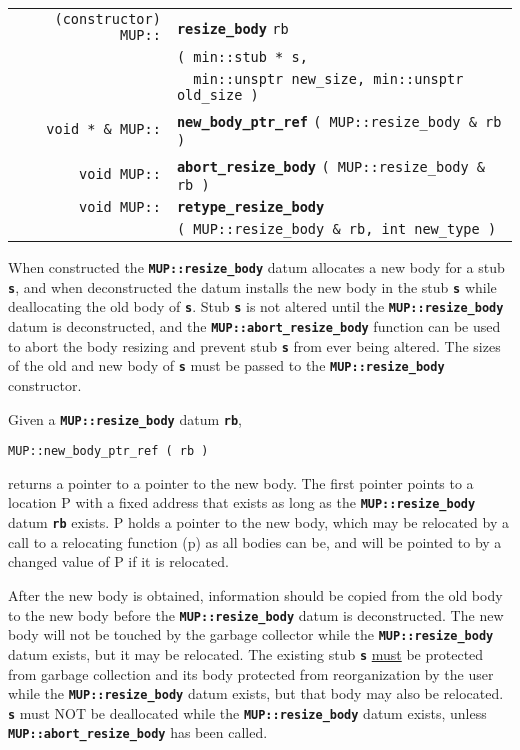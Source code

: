 \documentclass[12pt]{article}
\makeatletter
\newcommand{\TT}[1]{{\tt \bfseries #1}}
\newcommand{\ttindex}[1]{\index{#1@{\tt #1}}}
\newcommand{\pagref}[1]{p\pageref{#1}}
\newcommand{\EOL}{\penalty \exhyphenpenalty}
\newenvironment{indpar}[1][0.3in]%
	{\begin{list}{}%
		     {\setlength{\itemsep}{0in}%
		      \setlength{\topsep}{0in}%
		      \setlength{\parsep}{1ex}%
		      \setlength{\labelwidth}{#1}%
		      \setlength{\leftmargin}{#1}%
		      \addtolength{\leftmargin}{\labelsep}}%
	 \item}%
	{\end{list}}
\newcommand{\LABEL}[1]{\label{#1}}
\newlength{\ARGBREAKLENGTH}
\newcommand{\ARGBREAK}[1][\ARGBREAKLENGTH]{\\&\hspace*{#1}}
\newcommand{\MUPKEY}[1]%
	   {\TT{#1}\ttindex{MUP::#1}\ttindex{#1}}
\makeatother
\begin{document}
\begin{indpar}\begin{tabular}{@{}r@{}l@{}}
\verb|(constructor) MUP::| & \MUPKEY{resize\_body} \verb|rb|\ARGBREAK
    \verb|( min::stub * s,|\ARGBREAK
    \verb|  min::unsptr new_size, min::unsptr old_size )|
\LABEL{MUP::RESIZE_BODY} \\
\verb|void * & MUP::| & \MUPKEY{new\_body\_ptr\_ref}
	     \verb|( MUP::resize_body & rb )| 
\LABEL{MUP::NEW_BODY_PTR_REF} \\
\verb|void MUP::| & \MUPKEY{abort\_resize\_body}
	     \verb|( MUP::resize_body & rb )| 
\LABEL{MUP::ABORT_RESIZE_BODY} \\
\verb|void MUP::| & \MUPKEY{retype\_resize\_body}\ARGBREAK
	     \verb|( MUP::resize_body & rb, int new_type )| 
\LABEL{MUP::RETYPE_RESIZE_BODY} \\
\end{tabular}\end{indpar}

When constructed the \TT{MUP::resize\_body} datum allocates
a new body for a stub \TT{s}, and when deconstructed the datum
installs the new body in the stub \TT{s} while deallocating the
old body of \TT{s}.  Stub \TT{s}
is not altered until the \TT{MUP::\EOL resize\_\EOL body}
datum is deconstructed, and the \TT{MUP::\EOL abort\_\EOL resize\_\EOL body}
function can be used to abort the body resizing
and prevent stub \TT{s} from ever being altered.
The sizes of the old and new body of \TT{s} must be passed to
the \TT{MUP::\EOL resize\_\EOL body} constructor.

Given a \TT{MUP::\EOL resize\_\EOL body} datum \TT{rb},
\begin{center}
\verb|MUP::new_body_ptr_ref ( rb )|
\end{center}
returns a pointer to a pointer to the new body.  The first pointer
points to a location P with a fixed address that exists as long
as the \TT{MUP::\EOL resize\_\EOL body} datum \TT{rb} exists.   P holds
a pointer to the new body, which may be relocated by a call to
a relocating function (\pagref{RELOCATING-FUNCTIONS})
as all bodies
can be, and will be pointed to by a changed value of P if it is
relocated.

After the new body is obtained, information should be copied from
the old body to the new body before the \TT{MUP::\EOL resize\_\EOL body}
datum is deconstructed.  The new body will not be touched by
the garbage collector while the \TT{MUP::\EOL resize\_\EOL body} datum
exists, but it may be relocated.  The existing stub \TT{s}
\underline{must} be protected from garbage collection and
its body protected from reorganization by the user while the
\TT{MUP::\EOL resize\_\EOL body} datum exists, but that body may
also be relocated.  \TT{s} must NOT be deallocated
while the \TT{MUP::\EOL resize\_\EOL body} datum exists, unless
\TT{MUP::\EOL abort\_\EOL resize\_\EOL body} has been called.
\end{document}
